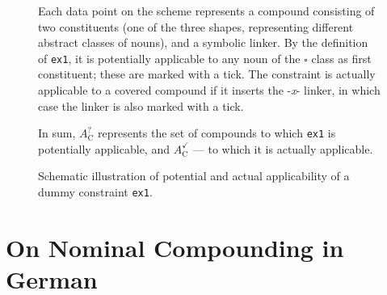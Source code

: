 \documentclass[10pt, a4paper]{article}
\begin{document}
\begin{figure}[!ht]
\begin{tcolorbox}







\vspace{-1.8em}

Each data point on the scheme represents a compound consisting of two constituents (one of the three shapes, representing different abstract classes of nouns), and a symbolic linker. By the definition of \texttt{ex1}, it is potentially applicable to any noun of the $\square$ class as first constituent; these are marked with a tick. The constraint is actually applicable to a covered compound if it inserts the -\textit{x}- linker, in which case the linker is also marked with a tick.

In sum, $A^{\bm{?}}_{\mathrm{C}}$ represents the set of compounds to which \texttt{ex1} is potentially applicable, and $A^{\checkmark}_{\mathrm{C}}$ --- to which it is actually applicable.

\end{tcolorbox}

\caption{Schematic illustration of potential and actual applicability of a dummy constraint \texttt{ex1}.}


\label{fig_reg_cov}
\end{figure}



\section{On Nominal Compounding in German}
\label{sec:comps}
\end{document}
